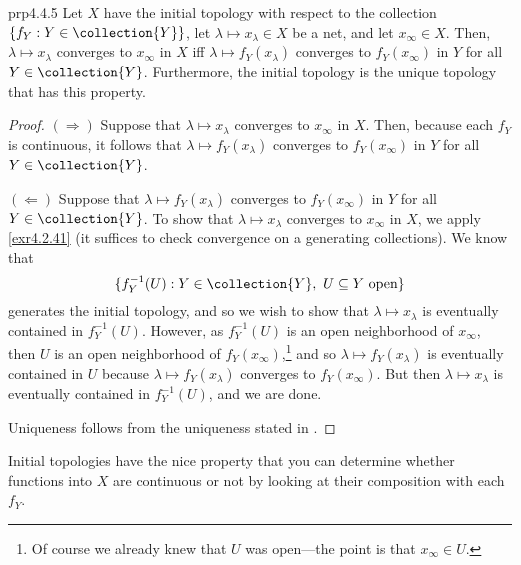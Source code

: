 \begin{prp}{}{prp4.4.5}
Let $X$ have the initial topology with respect to the collection $\{ f_Y:Y\in \collection{Y}\}$, let $\lambda \mapsto x_\lambda \in X$ be a net, and let $x_\infty \in X$.  Then, $\lambda \mapsto x_\lambda$ converges to $x_\infty$ in $X$ iff $\lambda \mapsto f_Y(x_\lambda )$ converges to $f_Y(x_\infty )$ in $Y$ for all $Y\in \collection{Y}$.  Furthermore, the initial topology is the unique topology that has this property.
\begin{proof}
$(\Rightarrow )$ Suppose that $\lambda \mapsto x_\lambda$ converges to $x_\infty$ in $X$.  Then, because each $f_Y$ is continuous, it follows that $\lambda \mapsto f_Y(x_\lambda )$ converges to $f_Y(x_\infty )$ in $Y$ for all $Y\in \collection{Y}$.

\blankline
\noindent
$(\Leftarrow )$ Suppose that $\lambda \mapsto f_Y(x_\lambda )$ converges to $f_Y(x_\infty )$ in $Y$ for all $Y\in \collection{Y}$.  To show that $\lambda \mapsto x_\lambda$ converges to $x_\infty$ in $X$, we apply \cref{exr4.2.41} (it suffices to check convergence on a generating collections).  We know that
\begin{equation}
\{ f_Y^{-1}(U):Y\in \collection{Y},\ U\subseteq Y\text{ open}\}
\end{equation}
generates the initial topology, and so we wish to show that $\lambda \mapsto x_\lambda$ is eventually contained in $f_Y^{-1}(U)$.  However, as $f_Y^{-1}(U)$ is an open neighborhood of $x_\infty$, then $U$ is an open neighborhood of $f_Y(x_\infty )$,\footnote{Of course we already knew that $U$ was open---the point is that $x_{\infty}\in U$.} and so $\lambda \mapsto f_Y(x_\lambda )$ is eventually contained in $U$ because $\lambda \mapsto f_Y(x_\lambda )$ converges to $f_Y(x_\infty )$.  But then $\lambda \mapsto x_\lambda$ is eventually contained in $f_Y^{-1}(U)$, and we are done.

\blankline
\noindent
Uniqueness follows from the uniqueness stated in .
\end{proof}
\end{prp}
Initial topologies have the nice property that you can determine whether functions into $X$ are continuous or not by looking at their composition with each $f_Y$.
